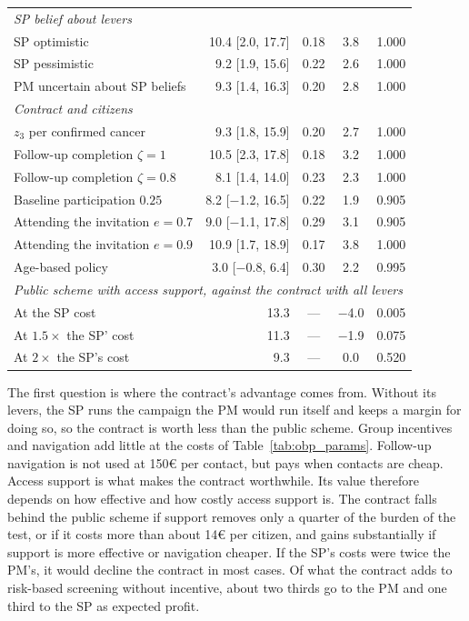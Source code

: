 \documentclass[12pt]{article}
\begin{document}
\begin{table}[!ht]
\begin{tabular}{l r c c c}
\multicolumn{5}{l}{\emph{SP belief about levers}} \\
SP optimistic & 10.4 [2.0, 17.7] & 0.18 & 3.8 & 1.000 \\
SP pessimistic & 9.2 [1.9, 15.6] & 0.22 & 2.6 & 1.000 \\
PM uncertain about SP beliefs & 9.3 [1.4, 16.3] & 0.20 & 2.8 & 1.000 \\
\midrule
\multicolumn{5}{l}{\emph{Contract and citizens}} \\
$z_3$ per confirmed cancer & 9.3 [1.8, 15.9] & 0.20 & 2.7 & 1.000 \\
Follow-up completion $\zeta = 1$ & 10.5 [2.3, 17.8] & 0.18 & 3.2 & 1.000 \\
Follow-up completion $\zeta = 0.8$ & 8.1 [1.4, 14.0] & 0.23 & 2.3 & 1.000 \\
Baseline participation $0.25$ & 8.2 [$-$1.2, 16.5] & 0.22 & 1.9 & 0.905 \\
Attending the invitation $e = 0.7$ & 9.0 [$-$1.1, 17.8] & 0.29 & 3.1 & 0.905 \\
Attending the invitation $e = 0.9$ & 10.9 [1.7, 18.9] & 0.17 & 3.8 & 1.000 \\
Age-based policy & 3.0 [$-$0.8, 6.4] & 0.30 & 2.2 & 0.995 \\
\midrule
\multicolumn{5}{l}{\emph{Public scheme with access support, against the contract with all levers}} \\
At the SP cost & 13.3 & --- & $-$4.0 & 0.005 \\
At $1.5\times$ the SP' cost & 11.3 & --- & $-$1.9 & 0.075 \\
At $2\times$ the SP's cost & 9.3 & --- & 0.0 & 0.520 \\
\bottomrule
\end{tabular}
\end{table}

The first question is where the contract's advantage comes from. Without its levers, the SP runs the campaign the PM would run itself and keeps a margin for doing so, so the contract is worth less than the public scheme. Group incentives and navigation add little at the costs of Table~\ref{tab:obp_params}. Follow-up navigation is not used at 150€ per contact, but pays when contacts are cheap. Access support is what makes the contract worthwhile. Its value therefore depends on how effective and how costly access support is. The contract falls behind the public scheme if support removes only a quarter of the burden of the test, or if it costs more than about 14€ per citizen, and gains substantially if support is more effective or navigation cheaper. If the SP's costs were twice the PM's, it would decline the contract in most cases. Of what the contract adds to risk-based screening without incentive, about two thirds go to the PM and one third to the SP as expected profit.
\end{document}
